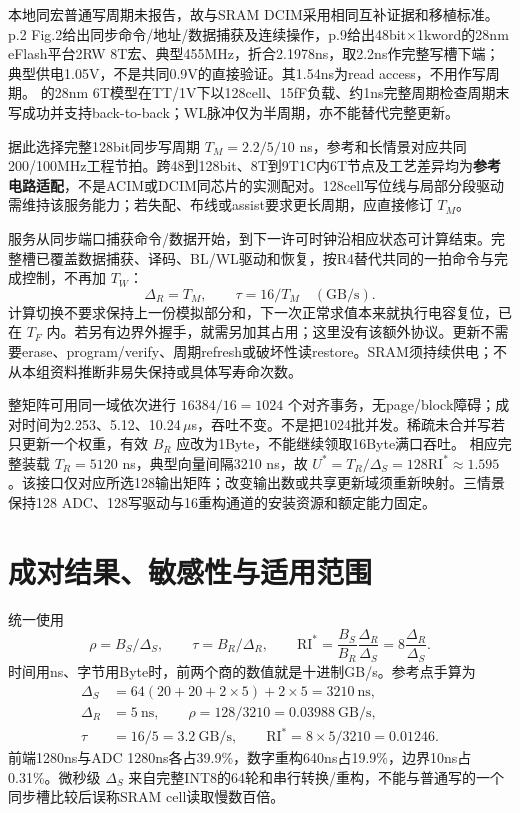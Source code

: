 本地同宏普通写周期未报告，故与SRAM DCIM采用相同互补证据和移植标准。 p.2 Fig.2给出同步命令/地址/数据捕获及连续操作，p.9给出48bit$\times$1kword的28nm eFlash平台2RW 8T宏、典型455MHz，折合2.1978ns，取2.2ns作完整写槽下端；典型供电1.05V，不是共同0.9V的直接验证。其1.54ns为read access，不用作写周期。 的28nm 6T模型在TT/1V下以128cell、15fF负载、约1ns完整周期检查周期末写成功并支持back-to-back；WL脉冲仅为半周期，亦不能替代完整更新。

据此选择完整128bit同步写周期 $T_M=2.2/5/10$ ns，参考和长情景对应共同200/100MHz工程节拍。跨48到128bit、8T到9T1C内6T节点及工艺差异均为\textbf{参考电路适配}，不是ACIM或DCIM同芯片的实测配对。128cell写位线与局部分段驱动需维持该服务能力；若失配、布线或assist要求更长周期，应直接修订 $T_M$。

服务从同步端口捕获命令/数据开始，到下一许可时钟沿相应状态可计算结束。完整槽已覆盖数据捕获、译码、BL/WL驱动和恢复，按R4替代共同的一拍命令与完成控制，不再加 $T_W$：
\begin{equation}
\Delta_R=T_M,\qquad \tau=16/T_M\quad(\mathrm{GB/s}).
\label{01_sram_acim:eq:dr}
\end{equation}
计算切换不要求保持上一份模拟部分和，下一次正常求值本来就执行电容复位，已在 $T_F$ 内。若另有边界外握手，就需另加其占用；这里没有该额外协议。更新不需要erase、program/verify、周期refresh或破坏性读restore。SRAM须持续供电；不从本组资料推断非易失保持或具体写寿命次数。

整矩阵可用同一域依次进行 $16384/16=1024$ 个对齐事务，无page/block障碍；成对时间为2.253、5.12、10.24\,$\mu$s，吞吐不变。不是把1024批并发。稀疏未合并写若只更新一个权重，有效 $B_R$ 应改为1Byte，不能继续领取16Byte满口吞吐。
相应完整装载 $T_R=5120$ ns，典型向量间隔3210 ns，故 $U^*=T_R/\Delta_S=128\mathrm{RI}^*\approx1.595$。该接口仅对应所选128输出矩阵；改变输出数或共享更新域须重新映射。三情景保持128 ADC、128写驱动与16重构通道的安装资源和额定能力固定。


\section{成对结果、敏感性与适用范围}



统一使用
\[
\rho=B_S/\Delta_S,\qquad \tau=B_R/\Delta_R,\qquad
\mathrm{RI}^{*}=\frac{B_S}{B_R}\frac{\Delta_R}{\Delta_S}
              =8\frac{\Delta_R}{\Delta_S}.
\]
时间用ns、字节用Byte时，前两个商的数值就是十进制GB/s。参考点手算为
\begin{align*}
\Delta_S&=64(20+20+2\times5)+2\times5=3210\ \mathrm{ns},\\
\Delta_R&=5\ \mathrm{ns},\qquad
\rho=128/3210=0.03988\ \mathrm{GB/s},\\
\tau&=16/5=3.2\ \mathrm{GB/s},\qquad
\mathrm{RI}^{*}=8\times5/3210=0.01246.
\end{align*}
前端1280ns与ADC 1280ns各占39.9\%，数字重构640ns占19.9\%，边界10ns占0.31\%。微秒级 $\Delta_S$ 来自完整INT8的64轮和串行转换/重构，不能与普通写的一个同步槽比较后误称SRAM cell读取慢数百倍。

